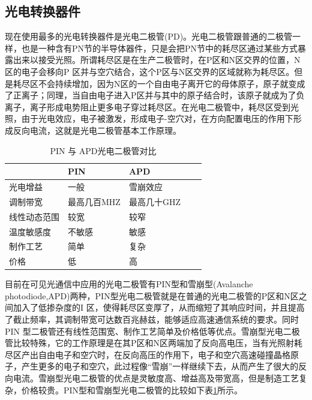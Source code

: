 \subsection{光电转换器件}
现在使用最多的光电转换器件是光电二极管(PD)。光电二极管跟普通的二极管一样，也是一种含有PN节的半导体器件，只是会把PN节中的耗尽区通过某些方式暴露出来以接受光照。所谓耗尽区是在生产二极管时，在P区和N区交界的位置，N区的电子会移向P 区并与空穴结合，这个P区与N区交界的区域就称为耗尽区。但是耗尽区不会持续增加，因为N区的一个自由电子离开它的母体原子，原子就变成了正离子；同理，当自由电子进入P区并与其中的原子结合时，该原子就成为了负离子，离子形成电势阻止更多电子穿过耗尽区。在光电二极管中，耗尽区受到光照，由于光电效应，电子被激发，形成电子-空穴对，在方向配置电压的作用下形成反向电流，这就是光电二极管基本工作原理。
\begin{table}[htbp]
    \caption{PIN 与 APD光电二极管对比}
    \label{tab:PIN_APD_Comparsion}
    \centering
    \begin{tabular}{lllll}
        \toprule
         & PIN & APD \\
        \midrule
        光电增益       & 一般   &雪崩效应    \\
        调制带宽       & 最高几百MHZ  &最高几十GHZ    \\
        线性动态范围   & 较宽  &较窄    \\
        温度敏感度    & 不敏感  &敏感    \\
        制作工艺    &简单 &复杂    \\
        价格    & 低  &高    \\
        \bottomrule
    \end{tabular}
\end{table}

目前在可见光通信中应用的光电二极管有PIN型和雪崩型(Avalanche photodiode,APD)两种，PIN型光电二极管就是在普通的光电二极管的P区和N区之间加入了低掺杂度的I 区，使得耗尽区变厚了，从而缩短了其响应时间，并且提高了截止频率，其调制带宽可达数百兆赫兹，能够适应高速通信系统的要求。同时PIN 型二极管还有线性范围宽、制作工艺简单及价格低等优点。雪崩型光电二极管比较特殊，它的工作原理是在其P区和N区两端加了反向高电压，当有光照射耗尽区产出自由电子和空穴时，在反向高压的作用下，电子和空穴高速碰撞晶格原子，产生更多的电子和空穴，此过程像“雪崩”一样继续下去，从而产生了很大的反向电流。雪崩型光电二极管的优点是灵敏度高、增益高及带宽高，但是制造工艺复杂，价格较贵。PIN型和雪崩型光电二极管的比较如下表\ref{tab:PIN_APD_Comparsion}所示。


